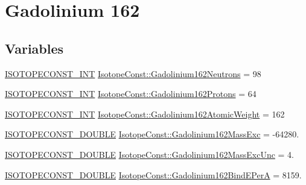\hypertarget{group___isotope_const-_gadolinium-_gd162}{}\section{Gadolinium 162}
\label{group___isotope_const-_gadolinium-_gd162}
\subsection*{Variables}
\begin{DoxyCompactItemize}
\item 
\mbox{\hyperlink{group___isotope_const-_macros_ga5f18360b3e99483a35c32d789e62621c}{I\+S\+O\+T\+O\+P\+E\+C\+O\+N\+S\+T\+\_\+\+I\+NT}} \mbox{\hyperlink{group___isotope_const-_gadolinium-_gd162_ga7a15ac0dac40a16fde3d76afc3758288}{Isotope\+Const\+::\+Gadolinium162\+Neutrons}} = 98
\item 
\mbox{\hyperlink{group___isotope_const-_macros_ga5f18360b3e99483a35c32d789e62621c}{I\+S\+O\+T\+O\+P\+E\+C\+O\+N\+S\+T\+\_\+\+I\+NT}} \mbox{\hyperlink{group___isotope_const-_gadolinium-_gd162_ga6e4623aa67d0865a914bf2d5ccf7f791}{Isotope\+Const\+::\+Gadolinium162\+Protons}} = 64
\item 
\mbox{\hyperlink{group___isotope_const-_macros_ga5f18360b3e99483a35c32d789e62621c}{I\+S\+O\+T\+O\+P\+E\+C\+O\+N\+S\+T\+\_\+\+I\+NT}} \mbox{\hyperlink{group___isotope_const-_gadolinium-_gd162_ga804e1b2f01642986f25fda04a8a0f418}{Isotope\+Const\+::\+Gadolinium162\+Atomic\+Weight}} = 162
\item 
\mbox{\hyperlink{group___isotope_const-_macros_ga8f45a7272ce02c0b4c65c44636ed719a}{I\+S\+O\+T\+O\+P\+E\+C\+O\+N\+S\+T\+\_\+\+D\+O\+U\+B\+LE}} \mbox{\hyperlink{group___isotope_const-_gadolinium-_gd162_ga85d42e8e80086b87c7d72398d49902a3}{Isotope\+Const\+::\+Gadolinium162\+Mass\+Exc}} = -\/64280.
\item 
\mbox{\hyperlink{group___isotope_const-_macros_ga8f45a7272ce02c0b4c65c44636ed719a}{I\+S\+O\+T\+O\+P\+E\+C\+O\+N\+S\+T\+\_\+\+D\+O\+U\+B\+LE}} \mbox{\hyperlink{group___isotope_const-_gadolinium-_gd162_ga5f124f2de9cb2ab428829c0f57de0c10}{Isotope\+Const\+::\+Gadolinium162\+Mass\+Exc\+Unc}} = 4.
\item 
\mbox{\hyperlink{group___isotope_const-_macros_ga8f45a7272ce02c0b4c65c44636ed719a}{I\+S\+O\+T\+O\+P\+E\+C\+O\+N\+S\+T\+\_\+\+D\+O\+U\+B\+LE}} \mbox{\hyperlink{group___isotope_const-_gadolinium-_gd162_gac125c68469274c9d13043e8af8b9a76f}{Isotope\+Const\+::\+Gadolinium162\+Bind\+E\+PerA}} = 8159.

\end{DoxyCompactItemize}

